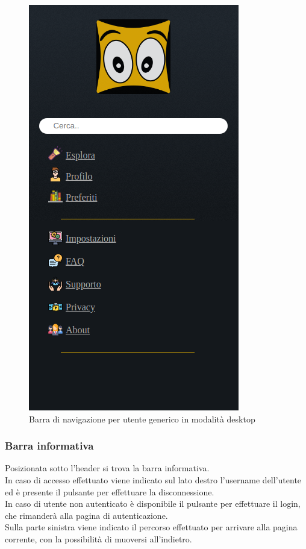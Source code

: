 \begin{figure}[h!]
	\centerline{\includegraphics[scale=0.45]{img/nav_bar.png}}
	\caption{Barra di navigazione per utente generico in modalità desktop}
	\label{fig:navbarGU}
\end{figure}

\subsubsection{Barra informativa}
Posizionata sotto l'header si trova la barra informativa.\\
In caso di accesso effettuato viene indicato sul lato destro l'username dell'utente ed è presente il pulsante per effettuare la disconnessione.\\
In caso di utente non autenticato è disponibile il pulsante per effettuare il login, che rimanderà alla pagina di autenticazione.\\
Sulla parte sinistra viene indicato il percorso effettuato per arrivare alla pagina corrente, con la possibilità di muoversi all'indietro.

